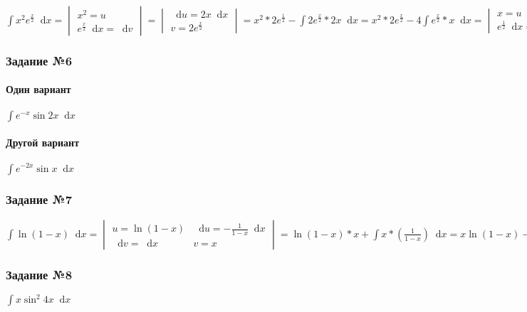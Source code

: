 \documentclass{article}
\newcommand*\diff{\mathop{}\!\mathrm{d}}
\begin{document}
$\int x^2 e^{\frac{x}{2}} \diff x = \begin{vmatrix}
    x^2 = u \\
    e^{\frac{x}{2}} \diff x = \diff v
\end{vmatrix} = \begin{vmatrix}
    \diff u = 2 x \diff x \\
    v = 2 e^{\frac{x}{2}}
\end{vmatrix} = x^2 * 2 e^{\frac{1}{2}} - \int 2 e^{\frac{x}{2}} * 2 x \diff x = x^2 * 2 e^{\frac{x}{2}} - 4 \int e^{\frac{x}{2}} * x \diff x = \begin{vmatrix}
    x = u \\
    e^{\frac{1}{2}} \diff x = \diff v
\end{vmatrix} = \begin{vmatrix}
    \diff u = \diff x \\
    v = 2 e^{\frac{1}{2}}
\end{vmatrix} = x^{2} * 2 e^{\frac{1}{2}} - 4 (2x e^{\frac{x}{2}} - \int 2 e^{\frac{x}{2}} \diff x) = x^2 2 e^{\frac{x}{2}} - 8 x e^{\frac{x}{2}} + 15 e^{\frac{x}{2}} + C$

\subsubsection{Задание №6}

\paragraph{Один вариант}

$
\int e^{-x} \sin 2 x \diff x
$

\paragraph{Другой вариант}

$
\int e^{- 2 x} \sin x \diff x 
$

\subsubsection{Задание №7}

$
\int \ln (1 - x) \diff x = \begin{vmatrix}
    u = \ln (1 - x) & \diff u = - \frac{1}{1 - x} \diff x \\
    \diff v = \diff x & v = x
\end{vmatrix} = \ln (1 - x) * x + \int x * (\frac{1}{1 - x}) \diff x = x \ln (1 - x) - \int \frac{-x}{1 - x} \diff x = x \ln (1 - x) - \int \frac{1 - x + 1}{1 - x} \diff x = x \ln (1 - x) - \int \frac{1 - x}{1 - x} * x + \int \frac{\diff x}{-1 + x} = x \ln (1 - x) - x + \ln |x - 1| + C
$

\subsubsection{Задание №8}

$\int x \sin^2 4x \diff x$
\end{document}
